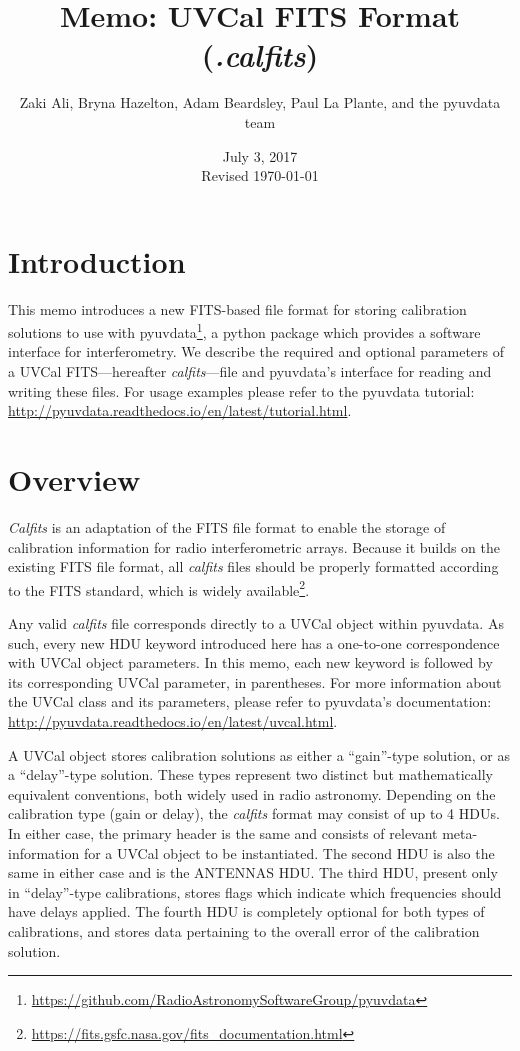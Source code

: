 \documentclass[11pt, oneside, english]{article}   	%
\title{Memo: UVCal FITS Format (\emph{.calfits})}
\author{Zaki Ali, Bryna Hazelton, Adam Beardsley, Paul La Plante, and the pyuvdata team}
\date{July 3, 2017\\
 Revised \today} %
\begin{document}
\maketitle
\section{Introduction}
This memo introduces a new FITS-based file format for storing calibration solutions to use with pyuvdata\footnote{\url{https://github.com/RadioAstronomySoftwareGroup/pyuvdata}}, a python package which
provides a software interface for interferometry.
We describe the required and optional parameters of a UVCal FITS---hereafter \textit{calfits}---file and pyuvdata's interface for reading and writing these files. 
For usage examples please refer to the pyuvdata tutorial: \url{http://pyuvdata.readthedocs.io/en/latest/tutorial.html}.

\section{Overview}
\textit{Calfits} is an adaptation of the FITS file format to enable the storage of calibration information for radio interferometric arrays.
Because it builds on the existing FITS file format, all \emph{calfits} files should be properly formatted according to the FITS standard, which is widely available\footnote{\url{https://fits.gsfc.nasa.gov/fits_documentation.html}}.


Any valid \textit{calfits} file corresponds directly to a UVCal object within pyuvdata.
As such, every new HDU keyword introduced here has a one-to-one correspondence with UVCal object parameters.
In this memo, each new keyword is followed by its corresponding UVCal parameter, in parentheses. 
For more information about the UVCal class and its parameters, please refer to pyuvdata's documentation: \url{http://pyuvdata.readthedocs.io/en/latest/uvcal.html}.

A UVCal object stores calibration solutions as either a ``gain''-type solution, or as a ``delay''-type solution.
These types represent two distinct but mathematically equivalent conventions, both widely used in radio astronomy.
Depending on the calibration type (gain or delay), the \textit{calfits} format may consist of up to 4 HDUs. 
In either case, the primary header is the same and consists of relevant meta-information for a UVCal object to be instantiated.
The second HDU is also the same in either case and is the ANTENNAS HDU. 
The third HDU, present only in ``delay''-type calibrations, stores flags which indicate which frequencies should have delays applied.
The fourth HDU is completely optional for both types of calibrations, and stores data pertaining to the overall error of the calibration solution.
\end{document}
